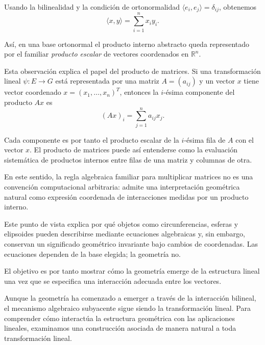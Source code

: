 Usando la bilinealidad y la condición de ortonormalidad
$\langle e_i,e_j\rangle=\delta_{ij}$, obtenemos
\[
\langle x,y\rangle
=
\sum_{i=1}^n x_i y_i.
\]

Así, en una base ortonormal el producto interno abstracto queda representado
por el familiar \emph{producto escalar} de vectores coordenados en $\mathbb{R}^n$.

\medskip

Esta observación explica el papel del producto de matrices.
Si una transformación lineal $\psi:E\to G$ está representada por una matriz
$A=(a_{ij})$ y un vector $x$ tiene vector coordenado $x=(x_1,\dots,x_n)^T$,
entonces la $i$-ésima componente del producto $Ax$ es
\[
(Ax)_i=\sum_{j=1}^n a_{ij}x_j.
\]

Cada componente es por tanto el producto escalar de la $i$-ésima fila de $A$
con el vector $x$.
El producto de matrices puede así entenderse como la evaluación sistemática de
productos internos entre filas de una matriz y columnas de otra.

\medskip

En este sentido, la regla algebraica familiar para multiplicar matrices no es
una convención computacional arbitraria: admite una interpretación geométrica
natural como expresión coordenada de interacciones medidas por un producto interno.

\medskip

Este punto de vista explica por qué objetos como circunferencias, esferas y
elipsoides pueden describirse mediante ecuaciones algebraicas y, sin embargo,
conservan un significado geométrico invariante bajo cambios de coordenadas.
Las ecuaciones dependen de la base elegida; la geometría no.

\medskip

El objetivo es por tanto mostrar cómo la geometría emerge de la estructura
lineal una vez que se especifica una interacción adecuada entre los vectores.

\medskip


Aunque la geometría ha comenzado a emerger a través de la interacción bilineal,
el mecanismo algebraico subyacente sigue siendo la transformación lineal.
Para comprender cómo interactúa la estructura geométrica con las aplicaciones
lineales, examinamos una construcción asociada de manera natural a toda
transformación lineal.

